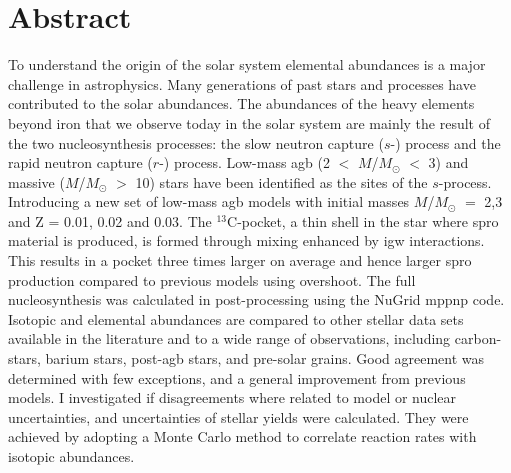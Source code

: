 \chapter{Abstract}

To understand the origin of the solar system elemental abundances is a major challenge in astrophysics. Many generations of past stars and processes have contributed to the solar abundances. The abundances of the heavy elements beyond iron that we observe today in the solar system are mainly the result of the two nucleosynthesis processes: the slow neutron capture ($s$-) process and the rapid neutron capture ($r$-) process. Low-mass \acrfull{agb} (2 $<$ $M$/$M_\odot$ $<$ 3) and massive ($M$/$M_\odot$ $>$ 10) stars have been identified as the sites of the $s$-process. Introducing a new set of low-mass \acrshort{agb} models with initial masses $M$/$M_\odot$ $=$ 2,3 and Z = 0.01, 0.02 and 0.03. The $^{13}$C-pocket, a thin shell in the star where \acrshort{spro} material is produced, is formed through mixing enhanced by \acrfull{igw} interactions. This results in a pocket three times larger on average and hence larger \acrshort{spro} production compared to previous models using overshoot. The full nucleosynthesis was calculated in post-processing using the NuGrid mppnp code. Isotopic and elemental abundances are compared to other stellar data sets available in the literature and to a wide range of observations, including carbon-stars, barium stars, post-\acrshort{agb} stars, and pre-solar grains. Good agreement was determined with few exceptions, and a general improvement from previous models. I investigated if disagreements where related to model or nuclear uncertainties, and uncertainties of stellar yields were calculated. They were achieved by adopting a Monte Carlo method to correlate reaction rates with isotopic abundances.